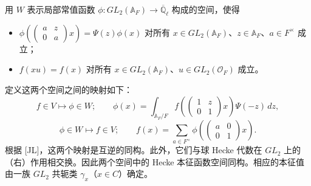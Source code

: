 \documentclass[11pt,a4paper]{article}
\begin{document}
用 $W$ 表示局部常值函数 $\phi:GL_2(\mathbb{A}_F)\to\overline{\mathbb{Q}}_\ell$ 构成的空间，使得
\begin{itemize}[leftmargin=2.2em,itemsep=2pt,topsep=2pt]
\item[(1$'$)] $\phi\left(\begin{pmatrix}a&z\\ 0&a\end{pmatrix}x\right)=\Psi(z)\phi(x)$ 对所有 $x\in GL_2(\mathbb{A}_F)$、$z\in\mathbb{A}_F$、$a\in F^\times$ 成立；
\item[(2$'$)] $f(xu)=f(x)$ 对所有 $x\in GL_2(\mathbb{A}_F)$、$u\in GL_2(\mathcal{O}_F)$ 成立。
\end{itemize}

定义这两个空间之间的映射如下：
\begin{equation}\tag{11.1}
f\in V\mapsto\phi\in W;\qquad \phi(x)=\int_{\mathbb{A}_F/F}f\left(\begin{pmatrix}1&z\\ 0&1\end{pmatrix}x\right)\Psi(-z)\,dz,
\end{equation}
\begin{equation}\tag{11.2}
\phi\in W\mapsto f\in V;\qquad f(x)=\sum_{a\in F^\times}\phi\left(\begin{pmatrix}a&0\\ 0&1\end{pmatrix}x\right).
\end{equation}
根据 [JL]，这两个映射是互逆的同构。此外，它们与球 Hecke 代数在 $GL_2$ 上的（右）作用相交换。因此两个空间中的 Hecke 本征函数空间同构。相应的本征值由一族 $GL_2$ 共轭类 $\gamma_x$（$x\in C$）确定。

\end{document}
